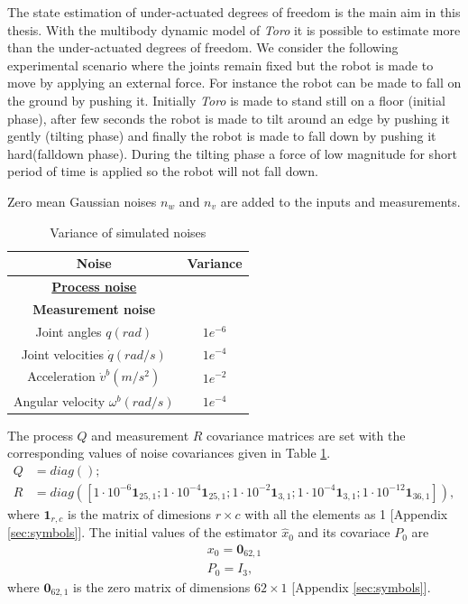 The state estimation of under-actuated degrees of freedom is the main aim in this thesis. With the multibody dynamic model of \emph{Toro} it is possible to estimate more than the under-actuated degrees of freedom. We consider the following experimental scenario where the joints remain fixed but the robot is made to move by applying an external force. For instance the robot can be made to fall on the ground by pushing it. Initially \emph{Toro} is made to stand still on a floor (initial phase), after few seconds the robot is made to tilt around an edge by pushing it gently (tilting phase) and finally the robot is made to fall down by pushing it hard(falldown phase). During the tilting phase a force of low magnitude for short period of time is applied so the robot will not fall down.

Zero mean Gaussian noises $n_w$ and $n_v$ are added to the inputs and measurements.
\begin{table}[H]
    \centering
    \begin{tabular}{|c|c|}
    \hline
    Noise &Variance \\ \hline
    \textbf{\underline{Process noise}} &\hspace{2mm}\\
    \hline
    \textbf{Measurement noise} &\hspace{2mm}\\
    Joint angles $q(rad)$ &$1e^{-6}$ \\ 
    Joint velocities $\dot q(rad/s)$ &$1e^{-4}$ \\
    Acceleration $\dot v^b(m/s^2)$ &$1e^{-2}$ \\ 
    Angular velocity $\omega^b(rad/s)$ &$1e^{-4}$ \\ \hline
    \end{tabular}
    \caption{Variance of simulated noises}
    \label{tab:toro_var}
\end{table}

The process $Q$ and measurement $R$ covariance matrices are set with the corresponding values of noise covariances given in Table \ref{tab:toro_var}. 
$$  \begin{aligned}
         Q &= diag();\\
         R &= diag([1\cdot{10}^{-6} \textbf{1}_{25,1}; 1\cdot{10}^{-4}\textbf{1}_{25,1}; 1\cdot{10}^{-2}\textbf{1}_{3,1};1\cdot{10}^{-4}\textbf{1}_{3,1}; 1\cdot{10}^{-12}\textbf{1}_{36,1} ]),
     \end{aligned}$$
where $\textbf{1}_{r,c}$ is the matrix of dimesions $r \times c$ with all the elements as 1 [Appendix \ref{sec:symbols}]. The initial values of the estimator $\hat x_0$ and its covariace $P_0$ are 
$$ \begin{aligned} x_0 = \textbf{0}_{62,1}\\ P_0 = I_3, \end{aligned} $$  where $\textbf{0}_{62,1}$ is the zero matrix of dimensions $62 \times 1$ [Appendix \ref{sec:symbols}].


